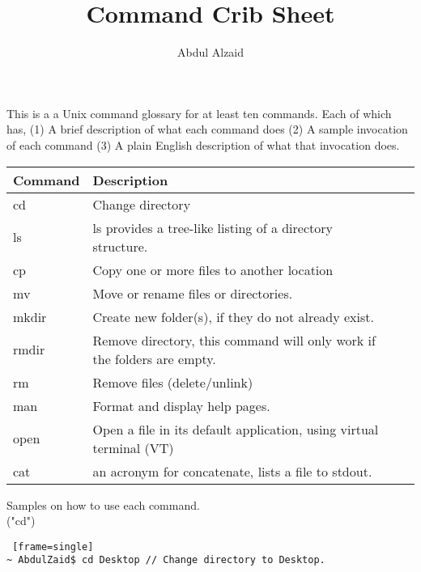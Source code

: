 \documentclass[12pt, oneside]{amsart}   	%
\title{Command Crib Sheet}
\author{Abdul Alzaid}
\begin{document}
\maketitle
This is a a Unix command glossary for at least ten commands. Each of which has, (1) A brief description of what each command does (2) A sample invocation of each command (3) A plain English description of what that invocation does.


\begin{center}
    \begin{tabular}{| l | l | l | l |}
    \hline
    Command & Description  \\ \hline
    cd & Change directory  \\ \hline
    ls &  ls provides a tree-like listing of a directory structure.  \\ \hline
    cp & Copy one or more files to another location  \\ \hline
    mv & Move or rename files or directories.  \\ \hline
    mkdir & Create new folder(s), if they do not already exist.  \\ \hline
    rmdir & Remove directory, this command will only work if the folders are empty.  \\ \hline
    rm & Remove files (delete/unlink)  \\ \hline
    man & Format and display help pages.  \\ \hline
    open & Open a file in its default application, using virtual terminal (VT)  \\ \hline
    cat &  an acronym for concatenate, lists a file to stdout.  \\ \hline
        \end{tabular}
\end{center}

{\Large Samples on how to use each command.}\\

("cd")
\begin{lstlisting} [frame=single]
~ AbdulZaid$ cd Desktop // Change directory to Desktop.
 \end{lstlisting} 
 
\end{document}
